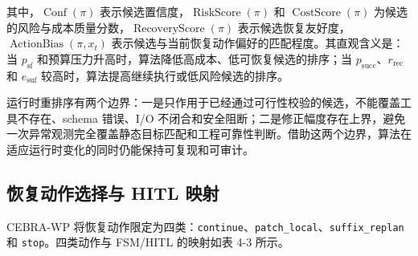 \begin{symboldefs}
\end{symboldefs}

其中，$\operatorname{Conf}(\pi)$ 表示候选置信度，$\operatorname{RiskScore}(\pi)$ 和
$\operatorname{CostScore}(\pi)$
为候选的风险与成本质量分数，$\operatorname{RecoveryScore}(\pi)$
表示候选恢复友好度，$\operatorname{ActionBias}(\pi,x_t)$
表示候选与当前恢复动作偏好的匹配程度。其直观含义是：当
$p_{\mathrm{sf}}$
和预算压力升高时，算法降低高成本、低可恢复候选的排序；当
$p_{\mathrm{succ}}$、$r_{\mathrm{rec}}$ 和
$e_{\mathrm{suf}}$
较高时，算法提高继续执行或低风险候选的排序。

运行时重排序有两个边界：一是只作用于已经通过可行性校验的候选，不能覆盖工具不存在、schema
错误、I/O
不闭合和安全阻断；二是修正幅度存在上界，避免一次异常观测完全覆盖静态目标匹配和工程可靠性判断。借助这两个边界，算法在适应运行时变化的同时仍能保持可复现和可审计。

\subsection{恢复动作选择与 HITL
映射}\label{ux6062ux590dux52a8ux4f5cux9009ux62e9ux4e0e-hitl-ux6620ux5c04}

CEBRA-WP
将恢复动作限定为四类：\texttt{continue}、\texttt{patch\_local}、\texttt{suffix\_replan}
和 \texttt{stop}。四类动作与 FSM/HITL 的映射如表 4-3 所示。

